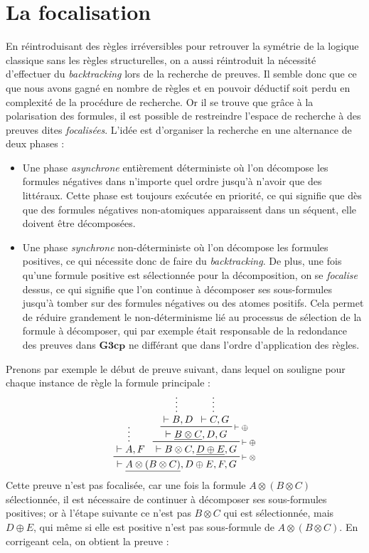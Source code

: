 \documentclass[12pt]{report}
\newcommand{\seq}{\vdash}
\newcommand{\irule}[1]{\footnotesize$#1$}
\newcommand{\iruleR}[1]{\irule{\seq{#1}}}
\begin{document}
\chapter*{La focalisation}

En réintroduisant des règles irréversibles pour retrouver la symétrie de la logique classique sans les règles structurelles, on a aussi réintroduit la nécessité d'effectuer du \textit{backtracking} lors de la recherche de preuves. Il semble donc que ce que nous avons gagné en nombre de règles et en pouvoir déductif soit perdu en complexité de la procédure de recherche. Or il se trouve que grâce à la polarisation des formules, il est possible de restreindre l'espace de recherche à des preuves dites \emph{focalisées}. L'idée est d'organiser la recherche en une alternance de deux phases :
\begin{itemize}
	\item Une phase \emph{asynchrone} entièrement déterministe où l'on décompose les formules négatives dans n'importe quel ordre jusqu'à n'avoir que des littéraux. Cette phase est toujours exécutée en priorité, ce qui signifie que dès que des formules négatives non-atomiques apparaissent dans un séquent, elle doivent être décomposées.
	\item Une phase \emph{synchrone} non-déterministe où l'on décompose les formules positives, ce qui nécessite donc de faire du \textit{backtracking}. De plus, une fois qu'une formule positive est sélectionnée pour la décomposition, on se \emph{focalise} dessus, ce qui signifie que l'on continue à décomposer ses sous-formules jusqu'à tomber sur des formules négatives ou des atomes positifs. Cela permet de réduire grandement le non-déterminisme lié au processus de sélection de la formule à décomposer, qui par exemple était responsable de la redondance des preuves dans $\mathbf{G3cp}$ ne différant que dans l'ordre d'application des règles.
\end{itemize}
Prenons par exemple le début de preuve suivant, dans lequel on souligne pour chaque instance de règle la formule principale :
\begin{displaymath}
	\prftree[r]{\iruleR{\otimes}}
		{\prfsummary{\seq A,F}}
		{\prftree[r]{\iruleR{\oplus}}
			{\prftree[r]{\iruleR{\oplus}}
				{\prfsummary{\seq B,D}}
				{\prfsummary{\seq C,G}}
				{\seq \underline{B \otimes C},D,G}}
			{\seq B \otimes C,\underline{D \oplus E},G}}
		{\seq \underline{A \otimes (B \otimes C)},D \oplus E,F,G}
\end{displaymath}
Cette preuve n'est pas focalisée, car une fois la formule $A \otimes (B \otimes C)$ sélectionnée, il est nécessaire de continuer à décomposer ses sous-formules positives; or à l'étape suivante ce n'est pas $B \otimes C$ qui est sélectionnée, mais $D \oplus E$, qui même si elle est positive n'est pas sous-formule de $A \otimes (B \otimes C)$. En corrigeant cela, on obtient la preuve :
\end{document}
